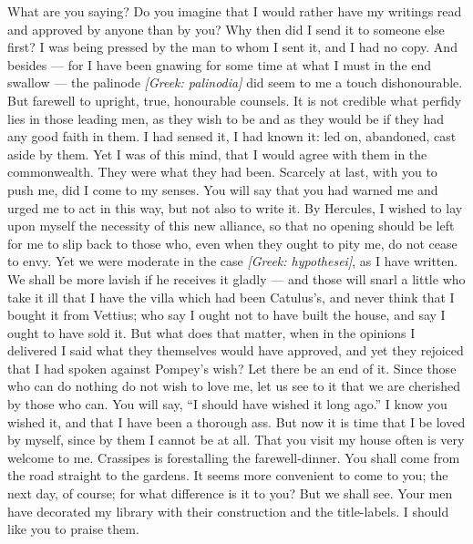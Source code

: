 

 What are you saying? Do you imagine that I would rather have my writings read and approved by anyone than by you? Why then did I send it to someone else first? I was being pressed by the man to whom I sent it, and I had no copy. And besides --- for I have been gnawing for some time at what I must in the end swallow --- the palinode \textit{[Greek: palinodia]} did seem to me a touch dishonourable. But farewell to upright, true, honourable counsels. It is not credible what perfidy lies in those leading men, as they wish to be and as they would be if they had any good faith in them. I had sensed it, I had known it: led on, abandoned, cast aside by them. Yet I was of this mind, that I would agree with them in the commonwealth. They were what they had been. Scarcely at last, with you to push me, did I come to my senses. You will say that you had warned me and urged me to act in this way, but not also to write it. By Hercules, I wished to lay upon myself the necessity of this new alliance, so that no opening should be left for me to slip back to those who, even when they ought to pity me, do not cease to envy. Yet we were moderate in the case \textit{[Greek: hypothesei]}, as I have written. We shall be more lavish if he receives it gladly --- and those will snarl a little who take it ill that I have the villa which had been Catulus's, and never think that I bought it from Vettius; who say I ought not to have built the house, and say I ought to have sold it. But what does that matter, when in the opinions I delivered I said what they themselves would have approved, and yet they rejoiced that I had spoken against Pompey's wish? Let there be an end of it. Since those who can do nothing do not wish to love me, let us see to it that we are cherished by those who can. You will say, ``I should have wished it long ago.'' I know you wished it, and that I have been a thorough ass. But now it is time that I be loved by myself, since by them I cannot be at all. That you visit my house often is very welcome to me. Crassipes is forestalling the farewell-dinner. You shall come from the road straight to the gardens. It seems more convenient to come to you; the next day, of course; for what difference is it to you? But we shall see. Your men have decorated my library with their construction and the title-labels. I should like you to praise them.
